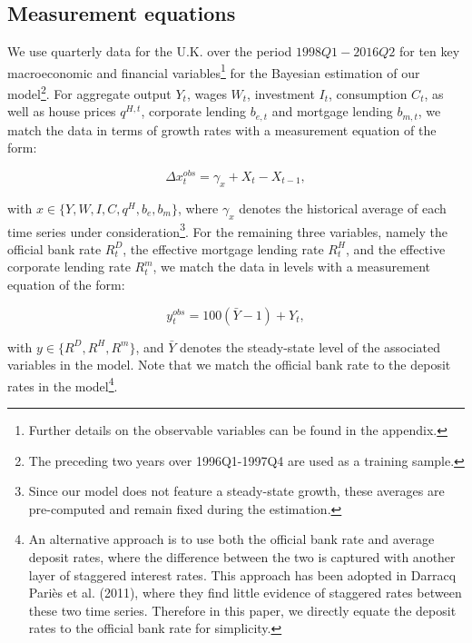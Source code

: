 \documentclass[12pt]{article}
\numberwithin{equation}{section}
\begin{document}
\subsection{Measurement equations} 

We use quarterly data for the U.K. over the period $1998Q1-2016Q2$ for ten key macroeconomic and financial variables\footnote{Further details on the observable variables can be found in the appendix.} for the Bayesian estimation of our model\footnote{The preceding two years over 1996Q1-1997Q4 are used as a training sample.}. For aggregate output $Y_t$, wages $W_t$, investment $I_t$, consumption $C_t$, as well as house prices $q^{H,t}$, corporate lending $b_{e,t}$ and mortgage lending $b_{m,t}$, we match the data in terms of growth rates with a measurement equation of the form: 

\begin{equation}
\Delta x_t^{obs}=\gamma_x+ X_t-X_{t-1},
\end{equation}

with $x \in \{Y, W, I, C, q^{H}, b_e, b_m \} $, where $\gamma_x$ denotes the historical average of each time series under consideration\footnote{Since our model does not feature a steady-state growth, these averages are pre-computed and remain fixed during the estimation.}. For the remaining three variables, namely the official bank rate $R^{D}_{t}$, the effective mortgage lending rate $R^H_t$, and the effective corporate lending rate $R^m_t$, we match the data in levels with a measurement equation of the form: 

\begin{equation}
y_t^{obs}=100(\bar{Y}-1) + Y_t,
\end{equation}

with $y \in \{R^D, R^H, R^m \}$, and $\bar{Y}$ denotes the steady-state level of the associated variables in the model. Note that we match the official bank rate to the deposit rates in the model\footnote{An alternative approach is to use both the official bank rate and average deposit rates, where the difference between the two is captured with another layer of staggered interest rates. This approach has been adopted in Darracq Pariès et al. (2011), where they find little evidence of staggered rates between these two time series. Therefore in this paper, we directly equate the deposit rates to the official bank rate for simplicity.}. 



\end{document}
